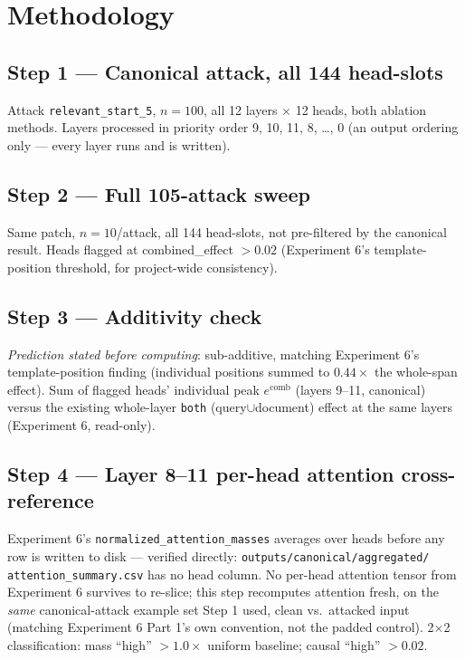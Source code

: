 \documentclass[11pt]{article}
\newcommand{\comb}{\ensuremath{e^{\mathrm{comb}}}}
\begin{document}
\section{Methodology}

\subsection{Step 1 — Canonical attack, all 144 head-slots}
Attack \texttt{relevant\_start\_5}, $n{=}100$, all 12 layers $\times$ 12 heads, both
ablation methods. Layers processed in priority order 9, 10, 11, 8, \dots, 0 (an output
ordering only — every layer runs and is written).

\subsection{Step 2 — Full 105-attack sweep}
Same patch, $n{=}10$/attack, all 144 head-slots, not pre-filtered by the canonical
result. Heads flagged at combined\_effect $> 0.02$ (Experiment 6's template-position
threshold, for project-wide consistency).

\subsection{Step 3 — Additivity check}
\emph{Prediction stated before computing}: sub-additive, matching Experiment 6's
template-position finding (individual positions summed to $0.44\times$ the whole-span
effect). Sum of flagged heads' individual peak $\comb$ (layers 9--11, canonical) versus
the existing whole-layer \texttt{both} (query$\cup$document) effect at the same layers
(Experiment 6, read-only).

\subsection{Step 4 — Layer 8--11 per-head attention cross-reference}
Experiment 6's \texttt{normalized\_attention\_masses} averages over heads before any row
is written to disk — verified directly: \texttt{outputs/canonical/aggregated/
attention\_summary.csv} has no head column. No per-head attention tensor from
Experiment 6 survives to re-slice; this step recomputes attention fresh, on the
\emph{same} canonical-attack example set Step 1 used, clean vs.\ attacked input (matching
Experiment 6 Part 1's own convention, not the padded control).
2$\times$2 classification: mass ``high'' $>1.0\times$ uniform baseline; causal ``high''
$>0.02$.
\end{document}
